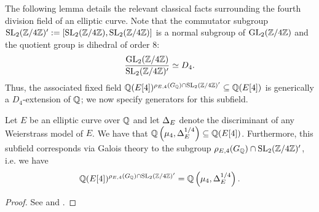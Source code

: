 The following lemma details the relevant classical facts surrounding the fourth division field of an elliptic curve.  Note that the commutator subgroup $\operatorname{SL}_2(\mathbb{Z}/4\mathbb{Z})' := \left[ \operatorname{SL}_2(\mathbb{Z}/4\mathbb{Z}), \operatorname{SL}_2(\mathbb{Z}/4\mathbb{Z}) \right]$ is a normal subgroup of $\operatorname{GL}_2(\mathbb{Z}/4\mathbb{Z})$ and the quotient group is dihedral of order 8:
\[
\frac{\operatorname{GL}_2(\mathbb{Z}/4\mathbb{Z})}{\operatorname{SL}_2(\mathbb{Z}/4\mathbb{Z})'} \simeq D_4.
\] 
Thus, the associated fixed field $\mathbb{Q}(E[4])^{\rho_{E,4}(G_{\mathbb{Q}}) \cap \operatorname{SL}_2(\mathbb{Z}/4\mathbb{Z})'} \subseteq \mathbb{Q}(E[4])$ is generically a $D_4$-extension of $\mathbb{Q}$; we now specify generators for this subfield.
\begin{lemma} \label{level4kummersubextensionlemma}
Let $E$ be an elliptic curve over $\mathbb{Q}$ and let $\Delta_E$ denote the discriminant of any Weierstrass model of $E$.  We have that $\mathbb{Q}\left( \mu_4, \Delta_E^{1/4} \right) \subseteq \mathbb{Q}(E[4])$.  Furthermore, this subfield corresponds via Galois theory to the subgroup $\rho_{E,4}(G_{\mathbb{Q}}) \cap \operatorname{SL}_2(\mathbb{Z}/4\mathbb{Z})'$, i.e. we have
\[
\mathbb{Q}(E[4])^{\rho_{E,4}(G_{\mathbb{Q}}) \cap \operatorname{SL}_2(\mathbb{Z}/4\mathbb{Z})' } = \mathbb{Q} \left( \mu_4, \Delta_E^{1/4} \right).
\]
\end{lemma}
\begin{proof}
See \cite[pp. 172--173]{langtrotter} and \cite[pp. 218--220]{langtrotter}.
\end{proof}

